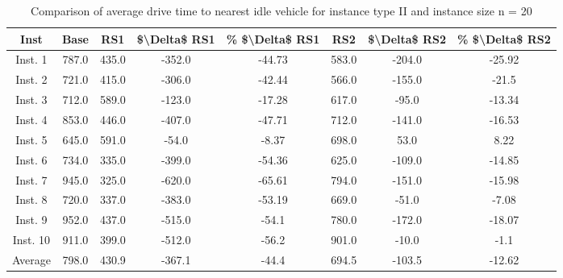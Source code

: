 \begin{table}[H]
\centering
\begin{tabular}{cccccccc}
  \hline
  \textbf{Inst} & \textbf{Base} & \textbf{RS1} & \textbf{\$\textbackslash{}Delta\$  RS1} & \textbf{\% \$\textbackslash{}Delta\$  RS1} & \textbf{RS2} & \textbf{\$\textbackslash{}Delta\$  RS2} & \textbf{\% \$\textbackslash{}Delta\$  RS2} \\\hline
  Inst. 1 & 787.0 & 435.0 & -352.0 & -44.73 & 583.0 & -204.0 & -25.92 \\
  Inst. 2 & 721.0 & 415.0 & -306.0 & -42.44 & 566.0 & -155.0 & -21.5 \\
  Inst. 3 & 712.0 & 589.0 & -123.0 & -17.28 & 617.0 & -95.0 & -13.34 \\
  Inst. 4 & 853.0 & 446.0 & -407.0 & -47.71 & 712.0 & -141.0 & -16.53 \\
  Inst. 5 & 645.0 & 591.0 & -54.0 & -8.37 & 698.0 & 53.0 & 8.22 \\
  Inst. 6 & 734.0 & 335.0 & -399.0 & -54.36 & 625.0 & -109.0 & -14.85 \\
  Inst. 7 & 945.0 & 325.0 & -620.0 & -65.61 & 794.0 & -151.0 & -15.98 \\
  Inst. 8 & 720.0 & 337.0 & -383.0 & -53.19 & 669.0 & -51.0 & -7.08 \\
  Inst. 9 & 952.0 & 437.0 & -515.0 & -54.1 & 780.0 & -172.0 & -18.07 \\
  Inst. 10 & 911.0 & 399.0 & -512.0 & -56.2 & 901.0 & -10.0 & -1.1 \\
  Average & 798.0 & 430.9 & -367.1 & -44.4 & 694.5 & -103.5 & -12.62 \\\hline
\end{tabular}
\caption{Comparison of average drive time to nearest idle vehicle for instance type II and instance size n = 20}
\label{tab:wait:resrelocation-nearest-drive-time-comparison_II_20}
\end{table}
